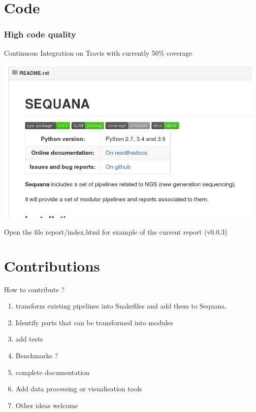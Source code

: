 \documentclass{beamer}
\begin{document}
\section{Code}

\begin{frame}[fragile]
    \frametitle{High code quality}
    \begin{block}{}
    Continuous Integration on Travis with currently 50\% coverage
    \end{block}
    
    
        \includegraphics[scale=0.35]{sequana_quality.png}
\end{frame}

\begin{frame}[fragile]

Open the file report/index.html for example of the current report (v0.0.3)

\end{frame}


\section{Contributions}
\begin{frame}{How to contribute ?}
\begin{enumerate}
 \item transform existing pipelines into Snakefiles and add them to Sequana.
 \item Identify parts that can be transformed into modules
 \item add tests
 \item Benchmarks ?
 \item complete documentation
 \item Add data processing or visualisation tools 
 \item Other ideas welcome
 \end{enumerate}
\end{frame}
\end{document}
